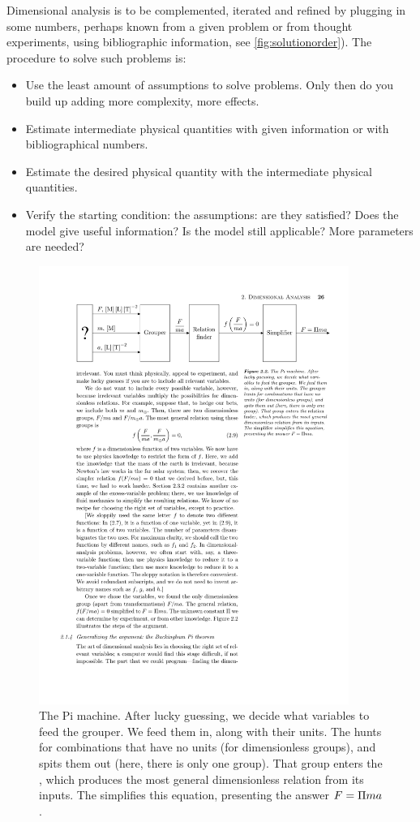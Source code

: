 %
Dimensional analysis is to be complemented, iterated and refined by plugging in some numbers, perhaps known from a given problem or from thought experiments, using bibliographic information, see \cref{fig:solutionorder}). The procedure to solve such problems is:
\begin{itemize}
\item Use the least amount of assumptions to solve problems. Only then do you build up adding more complexity, more effects.
%
\item Estimate intermediate physical quantities with given information or with bibliographical numbers.
%
\item Estimate the desired physical quantity with the intermediate physical quantities.
%
\item Verify the starting condition: the assumptions: are they satisfied? Does the model give useful information? Is the model still applicable? More parameters are needed?
%
\end{itemize}
%
%
\begin{figure}[bt]\label{fig:pimachine}
  \caption{The Pi machine. After lucky guessing, we decide what variables to feed the grouper. We feed them in, along with their units. The  hunts for combinations that have no units (for dimensionless groups), and spits them out (here, there is only one group). That group enters the , which produces the most general dimensionless relation from its inputs. The  simplifies this equation, presenting the answer $F = \Pi ma$.}
  \centering
    \includegraphics[width=0.9\textwidth]{./graphs/pi-machine.pdf}
\end{figure}
